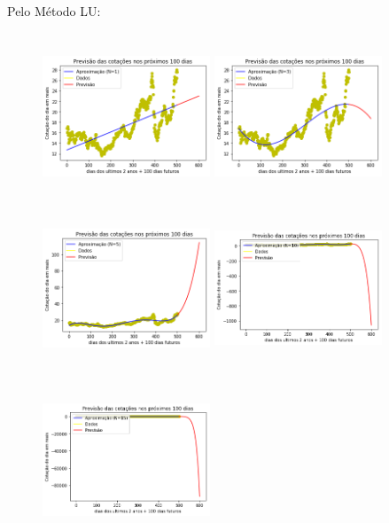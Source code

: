 \documentclass{article}
\begin{document}
\item Pelo Método LU:
\begin{figure}[!htb]
\includegraphics [width=5cm,height=5cm]{PrevisaoLU/P1.png}
\includegraphics [width=5cm,height=5cm]{PrevisaoLU/P3.png}
\includegraphics [width=5cm,height=5cm]{PrevisaoLU/P5.png}
\includegraphics [width=5cm,height=5cm]{PrevisaoLU/P10.png}
\includegraphics [width=5cm,height=5cm]{PrevisaoLU/P15.png}

\end{figure}
\end{document}
